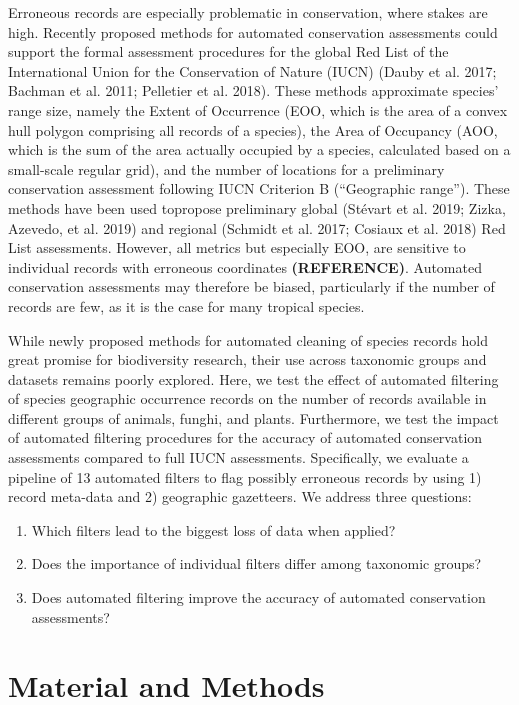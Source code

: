 \documentclass[fleqn,10pt,lineno]{wlpeerj} %
\providecommand{\tightlist}{
\setlength{\itemsep}{0pt}\setlength{\parskip}{0pt}}
\begin{document}
Erroneous records are especially problematic in conservation, where stakes are high. Recently proposed methods for automated conservation assessments could support the formal assessment procedures for the global Red List of the International Union for the Conservation of Nature (IUCN) (Dauby et al. 2017; Bachman et al. 2011; Pelletier et al. 2018). These methods approximate species' range size, namely the Extent of Occurrence (EOO, which is the area of a convex hull polygon comprising all records of a species), the Area of Occupancy (AOO, which is the sum of the area actually occupied by a species, calculated based on a small-scale regular grid), and the number of locations for a preliminary conservation assessment following IUCN Criterion B (``Geographic range''). These methods have been used topropose preliminary global (Stévart et al. 2019; Zizka, Azevedo, et al. 2019) and regional (Schmidt et al. 2017; Cosiaux et al. 2018) Red List assessments. However, all metrics but especially EOO, are sensitive to individual records with erroneous coordinates \textbf{(REFERENCE)}. Automated conservation assessments may therefore be biased, particularly if the number of records are few, as it is the case for many tropical species.

While newly proposed methods for automated cleaning of species records hold great promise for biodiversity research, their use across taxonomic groups and datasets remains poorly explored. Here, we test the effect of automated filtering of species geographic occurrence records on the number of records available in different groups of animals, funghi, and plants. Furthermore, we test the impact of automated filtering procedures for the accuracy of automated conservation assessments compared to full IUCN assessments. Specifically, we evaluate a pipeline of 13 automated filters to flag possibly erroneous records by using 1) record meta-data and 2) geographic gazetteers. We address three questions:

\begin{enumerate}
\def\labelenumi{\arabic{enumi}.}
\tightlist
\item
  Which filters lead to the biggest loss of data when applied?
\item
  Does the importance of individual filters differ among taxonomic groups?
\item
  Does automated filtering improve the accuracy of automated conservation assessments?
\end{enumerate}

\hypertarget{material-and-methods}{%
\section*{Material and Methods}\label{material-and-methods}}
\end{document}
